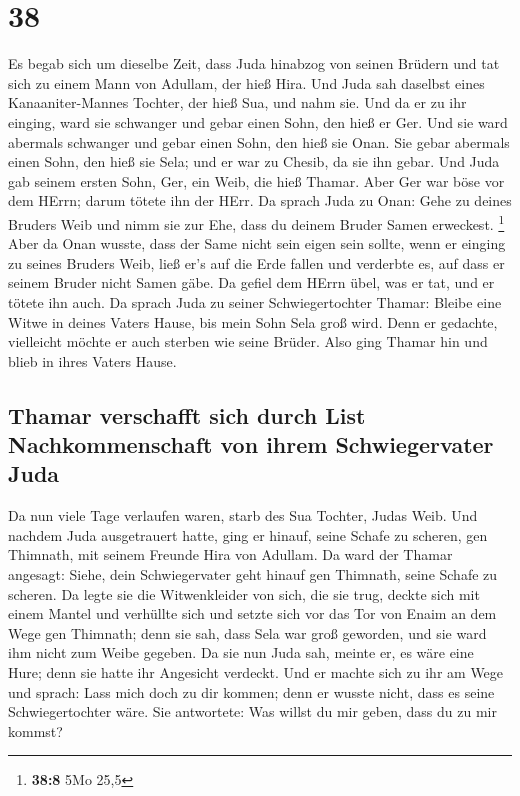 \hypertarget{section-37}{%
\section{38}\label{section-37}}

 Es begab sich um dieselbe Zeit, dass Juda hinabzog von
seinen Brüdern und tat sich zu einem Mann von Adullam, der hieß Hira.
 Und Juda sah daselbst eines Kanaaniter-Mannes Tochter,
der hieß Sua, und nahm sie. Und da er zu ihr einging, 
ward sie schwanger und gebar einen Sohn, den hieß er Ger. 
Und sie ward abermals schwanger und gebar einen Sohn, den hieß sie Onan.
 Sie gebar abermals einen Sohn, den hieß sie Sela; und er
war zu Chesib, da sie ihn gebar.  Und Juda gab seinem
ersten Sohn, Ger, ein Weib, die hieß Thamar.  Aber Ger war
böse vor dem HErrn; darum tötete ihn der HErr.  Da sprach
Juda zu Onan: Gehe zu deines Bruders Weib und nimm sie zur Ehe, dass du
deinem Bruder Samen erweckest. \footnote{\textbf{38:8} 5Mo 25,5}
 Aber da Onan wusste, dass der Same nicht sein eigen sein
sollte, wenn er einging zu seines Bruders Weib, ließ er's auf die Erde
fallen und verderbte es, auf dass er seinem Bruder nicht Samen gäbe.
 Da gefiel dem HErrn übel, was er tat, und er tötete ihn
auch.  Da sprach Juda zu seiner Schwiegertochter Thamar:
Bleibe eine Witwe in deines Vaters Hause, bis mein Sohn Sela groß wird.
Denn er gedachte, vielleicht möchte er auch sterben wie seine Brüder.
Also ging Thamar hin und blieb in ihres Vaters Hause.

\hypertarget{thamar-verschafft-sich-durch-list-nachkommenschaft-von-ihrem-schwiegervater-juda}{%
\subsection{Thamar verschafft sich durch List Nachkommenschaft von ihrem
Schwiegervater
Juda}\label{thamar-verschafft-sich-durch-list-nachkommenschaft-von-ihrem-schwiegervater-juda}}

 Da nun viele Tage verlaufen waren, starb des Sua
Tochter, Judas Weib. Und nachdem Juda ausgetrauert hatte, ging er
hinauf, seine Schafe zu scheren, gen Thimnath, mit seinem Freunde Hira
von Adullam.  Da ward der Thamar angesagt: Siehe, dein
Schwiegervater geht hinauf gen Thimnath, seine Schafe zu scheren.
 Da legte sie die Witwenkleider von sich, die sie trug,
deckte sich mit einem Mantel und verhüllte sich und setzte sich vor das
Tor von Enaim an dem Wege gen Thimnath; denn sie sah, dass Sela war groß
geworden, und sie ward ihm nicht zum Weibe gegeben.  Da
sie nun Juda sah, meinte er, es wäre eine Hure; denn sie hatte ihr
Angesicht verdeckt.  Und er machte sich zu ihr am Wege
und sprach: Lass mich doch zu dir kommen; denn er wusste nicht, dass es
seine Schwiegertochter wäre. Sie antwortete: Was willst du mir geben,
dass du zu mir kommst?

